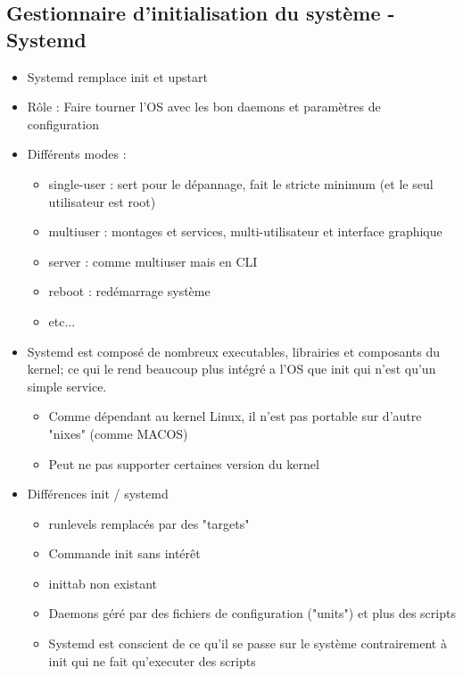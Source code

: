 \documentclass[a4paper]{article}
\begin{document}
      \subsection{Gestionnaire d'initialisation du système - Systemd}
      \begin{itemize}[label = \textbullet, font = \Large]
        \item Systemd remplace init et upstart
        \item Rôle : Faire tourner l'OS avec les bon daemons et paramètres de configuration
        \item Différents modes :
        \begin{itemize}[label=, font=\scriptsize] 
          \item single-user : sert pour le dépannage, fait le stricte minimum (et le seul utilisateur est root)
          \item multiuser : montages et services, multi-utilisateur et interface graphique
          \item server : comme multiuser mais en CLI
          \item reboot : redémarrage système
          \item etc...
        \end{itemize}
        \item Systemd est composé de nombreux executables, librairies et composants du kernel; ce qui le rend beaucoup plus intégré a l'OS que init qui n'est qu'un simple service.
        \begin{itemize}[label=, font=\scriptsize] 
          \item Comme dépendant au kernel Linux, il n'est pas portable sur d'autre "nixes" (comme MACOS)
          \item Peut ne pas supporter certaines version du kernel
        \end{itemize}
        \item Différences init / systemd
        \begin{itemize}[label=, font=\scriptsize] 
          \item runlevels remplacés par des "targets"
          \item Commande init sans intérêt
          \item inittab non existant
          \item Daemons géré par des fichiers de configuration ("units") et plus des scripts
          \item Systemd est conscient de ce qu'il se passe sur le système contrairement à init qui ne fait qu'executer des scripts

\end{itemize}
\end{itemize}
\end{document}
